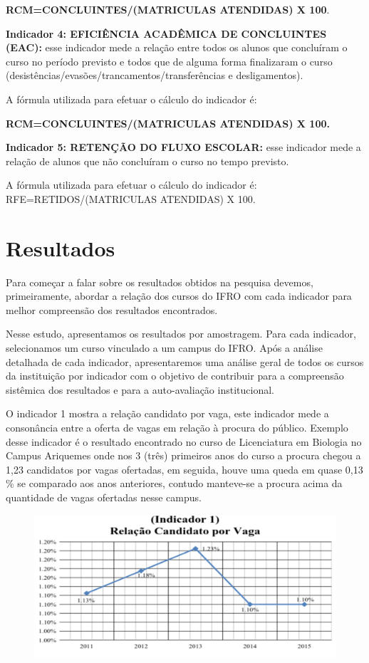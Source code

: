 \documentclass[article,12pt,onesidea,4paper,english,brazil]{abntex2}
\begin{document}
	\textbf{RCM=CONCLUINTES/(MATRICULAS ATENDIDAS) X 100}.
	
	\textbf{Indicador 4: EFICIÊNCIA ACADÊMICA DE CONCLUINTES (EAC):} esse indicador mede
	a relação entre todos os alunos que concluíram o curso no período previsto e todos que de alguma
	forma finalizaram o curso (desistências/evasões/trancamentos/transferências e desligamentos).
	
	A fórmula utilizada para efetuar o cálculo do indicador é:
	
	\textbf{RCM=CONCLUINTES/(MATRICULAS ATENDIDAS) X 100.}
	
	\textbf{Indicador 5: RETENÇÃO DO FLUXO ESCOLAR:} esse indicador mede a relação de alunos
	que não concluíram o curso no tempo previsto.
	
	A fórmula utilizada para efetuar o cálculo do indicador é:
	RFE=RETIDOS/(MATRICULAS ATENDIDAS) X 100.
	
	\section*{Resultados}
	
	Para começar a falar sobre os resultados obtidos na pesquisa devemos, primeiramente,
	abordar a relação dos cursos do IFRO com cada indicador para melhor compreensão dos
	resultados encontrados.

	Nesse estudo, apresentamos os resultados por amostragem. Para cada indicador,
	selecionamos um curso vinculado a um campus do IFRO. Após a análise detalhada de cada
	indicador, apresentaremos uma análise geral de todos os cursos da instituição por indicador com o
	objetivo de contribuir para a compreensão sistêmica dos resultados e para a auto-avaliação
	institucional.
	
	O indicador 1 mostra a relação candidato por vaga, este indicador mede a consonância
	entre a oferta de vagas em relação à procura do público. Exemplo desse indicador é o resultado
	encontrado no curso de Licenciatura em Biologia no Campus Ariquemes onde nos 3 (três)
	primeiros anos do curso a procura chegou a 1,23 candidatos por vagas ofertadas, em seguida,
	houve uma queda em quase 0,13 \% se comparado aos anos anteriores, contudo manteve-se a
	procura acima da quantidade de vagas ofertadas nesse campus.
	
	\begin{figure}[ht]
		\centering
		\includegraphics[width=.9\linewidth]{PIP-97-1}
	\end{figure}
	
\end{document}
